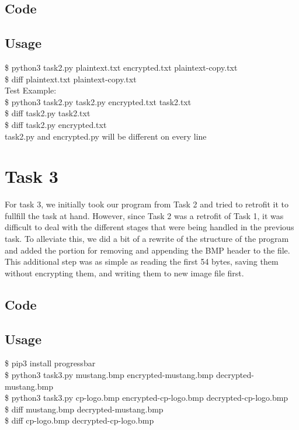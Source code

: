 \documentclass[11pt]{article}
\begin{document}
  \subsection{Code}
  \subsection{Usage}
    {\tt\begin{tabbing}                                                                                                                                                                     
       \$ python3 task2.py plaintext.txt encrypted.txt plaintext-copy.txt\\
       \$ diff plaintext.txt plaintext-copy.txt\\
       Test Example:\\
       \$ python3 task2.py task2.py encrypted.txt task2.txt\\
       \$ diff task2.py task2.txt\\
       \$ diff task2.py encrypted.txt\\
       task2.py and encrypted.py will be different on every line
      \end{tabbing}}

\section{Task 3}
  For task 3, we initially took our program from Task 2 and tried to retrofit 
  it to fullfill the task at hand. However, since Task 2 was a retrofit of Task 
  1, it was difficult to deal with the different stages that were being 
  handled in the previous task. To alleviate this, we did a bit of a rewrite of the
  structure of the program and added the portion for removing and appending the 
  BMP header to the file. This additional step was as simple as reading the 
  first 54 bytes, saving them without encrypting them, and writing them to new 
  image file first. 
  \subsection{Code}
  \subsection{Usage}
    {\tt\begin{tabbing}                                                                                                                                                                     
      \$ pip3 install progressbar\\
      \$ python3 task3.py mustang.bmp encrypted-mustang.bmp decrypted-mustang.bmp\\
      \$ python3 task3.py cp-logo.bmp encrypted-cp-logo.bmp decrypted-cp-logo.bmp\\
      \$ diff mustang.bmp decrypted-mustang.bmp\\
      \$ diff cp-logo.bmp decrypted-cp-logo.bmp\\
    \end{tabbing}}
\end{document}
